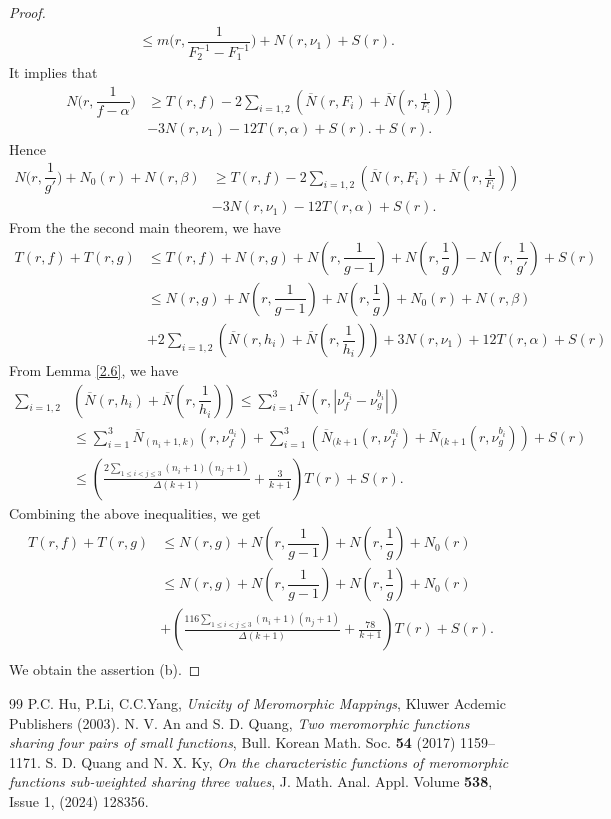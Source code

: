 \documentclass[10pt,a4paper]{amsart}
\begin{document}
\begin{proof}
\begin{align*}
&\le m\Big(r,\dfrac{1}{F_2^{-1}-F_1^{-1}}\Big)+N(r,\nu_1)+S(r).
\end{align*}
It implies that
\begin{align*}
N\Big(r,\dfrac{1}{f-\alpha}\Big)&\ge T(r,f)-2\sum_{i=1,2}\left (\overline{N}(r,F_i)+\overline N(r,\frac{1}{F_i})\right)\\
&-3N(r,\nu_1)-12T(r,\alpha)+S(r).+S(r).
\end{align*}
Hence 
\begin{align*}
N\Big(r,\dfrac{1}{g'}\Big)+N_0(r)+N(r,\beta)&\ge T(r,f)-2\sum_{i=1,2}\left (\overline{N}(r,F_i)+\overline N(r,\frac{1}{F_i})\right)\\
&-3N(r,\nu_1)-12T(r,\alpha)+S(r).
\end{align*}
From the the second main theorem, we have
\begin{align*}
    T(r,f)+T(r,g)&\le T(r,f)+N(r,g)+N\left(r, \dfrac{1}{g-1}\right) +N\left(r, \dfrac{1}{g}\right)-N\left(r, \dfrac{1}{g'}\right)+S(r)\\
    &\le N(r,g)+N\left(r, \dfrac{1}{g-1}\right) +N\left(r, \dfrac{1}{g}\right)+N_0(r)+N(r, \beta)\\
    &+2\sum_{i=1,2}\left(\overline{N}(r, h_i)+\overline{N}\left(r, \dfrac{1}{h_i}\right)\right)+3N(r, \nu_1)+12T(r, \alpha)+S(r)
\end{align*}
From Lemma \ref{2.6}, we have
\begin{align*}
    \sum_{i=1,2}&\left(\overline{N}(r, h_i)+\overline{N}\left(r, \dfrac{1}{h_i}\right)\right)\le \sum_{i=1}^3\overline N(r,|\nu^{a_i}_f-\nu^{b_i}_g|)\\
    &\le \sum_{i=1}^3\overline N_{(n_i+1,k)}(r,\nu^{a_i}_f)+\sum_{i=1}^3\left(\overline N_{(k+1}(r,\nu^{a_i}_f)+\overline N_{(k+1}(r,\nu^{b_i}_g) \right)+S(r)\\
    &\le \left(\frac{2\sum_{1\le i<j\le 3}(n_i+1)(n_j+1)}{\Delta(k+1)}+\frac{3}{k+1}\right)T(r)+S(r).
\end{align*} 
Combining the above inequalities, we get
\begin{align*}
    T(r, f)+T(r, g)&\le N(r,g)+N\left(r, \dfrac{1}{g-1}\right) +N\left(r, \dfrac{1}{g}\right)+N_0(r)\\
    &\le N(r,g)+N\left(r, \dfrac{1}{g-1}\right) +N\left(r, \dfrac{1}{g}\right)+N_0(r)\\
    &+\left(\frac{116\sum_{1\le i<j\le 3}(n_i+1)(n_j+1)}{\Delta(k+1)}+\frac{78}{k+1}\right)T(r)+ S(r). \\
\end{align*}
We obtain the assertion (b).
\end{proof}

\begin{thebibliography}{99}
 P.C. Hu, P.Li, C.C.Yang, \textit{Unicity of Meromorphic Mappings}, Kluwer Acdemic Publishers (2003).
 N. V. An and S. D. Quang, \textit{Two meromorphic functions sharing four pairs of small functions}, Bull. Korean Math. Soc. \textbf{54} (2017) 1159--1171.
 S. D. Quang and N. X. Ky, \textit{On the characteristic functions of meromorphic functions sub-weighted sharing three values}, J. Math. Anal. Appl. Volume \textbf{538}, Issue 1, (2024) 128356.
\end{thebibliography}
\end{document}

